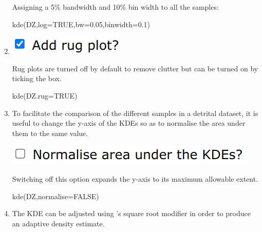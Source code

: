 \begin{refsection}
\begin{enumerate}
Assigning a 5\% bandwidth and 10\% bin width to all the samples:

\begin{console}
kde(DZ,log=TRUE,bw=0.05,binwidth=0.1)
\end{console}

\item\noindent\begin{minipage}[t]{.18\linewidth}
\strut\vspace*{-\baselineskip}\newline
\includegraphics[width=\linewidth]{../figures/detritalrug.png}
\end{minipage}
\begin{minipage}[t]{.82\linewidth}
  Rug plots are turned off by default to remove clutter but can be
  turned on by ticking the box.
\end{minipage}

\begin{console}
kde(DZ.rug=TRUE)
\end{console}

\item To facilitate the comparison of the different samples in a
  detrital dataset, it is useful to change the y-axis of the KDEs so
  as to normalise the area under them to the same value.

\noindent\begin{minipage}[t]{.38\linewidth}
\strut\vspace*{-\baselineskip}\newline
\includegraphics[width=\linewidth]{../figures/detritalKDEnormalise.png}
\end{minipage}
\begin{minipage}[t]{.62\linewidth}
Switching off this option expands the y-axis to its maximum allowable
extent.
\end{minipage}

\begin{console}
kde(DZ,normalise=FALSE)
\end{console}

\item The KDE can be adjusted using \citet{abramson1982}'s square root
  modifier in order to produce an adaptive density estimate.


\end{enumerate}
\end{refsection}
